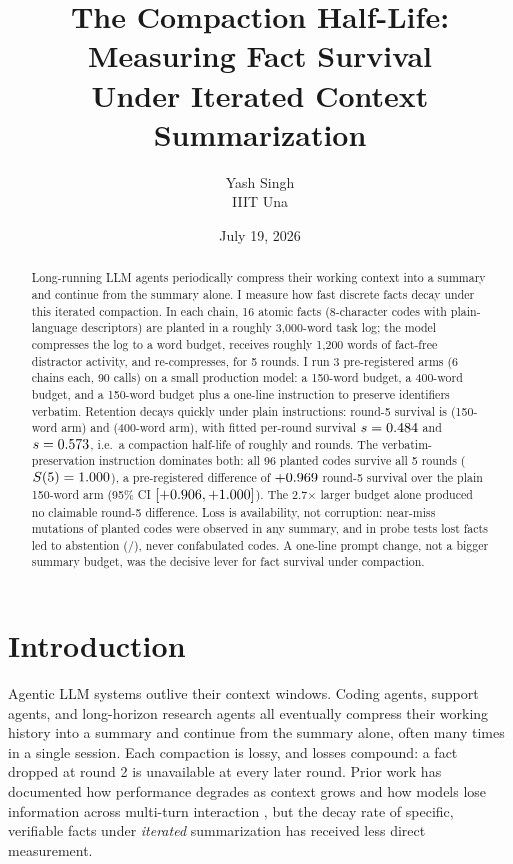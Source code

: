 \documentclass[11pt]{article}
\title{The Compaction Half-Life: Measuring Fact Survival\\Under Iterated Context Summarization}
\author{Yash Singh\\\small IIIT Una}
\date{July 19, 2026}
\begin{document}
\maketitle

\begin{abstract}
Long-running LLM agents periodically compress their working context into a
summary and continue from the summary alone. I measure how fast discrete facts
decay under this iterated compaction. In each chain, 16 atomic facts (8-character
codes with plain-language descriptors) are planted in a roughly 3{,}000-word task
log; the model compresses the log to a word budget, receives roughly 1{,}200 words
of fact-free distractor activity, and re-compresses, for 5 rounds. I run 3
pre-registered arms (6 chains each, 90 calls) on a small production model:
a 150-word budget, a 400-word budget, and a 150-word budget plus a one-line
instruction to preserve identifiers verbatim. Retention decays quickly under
plain instructions: round-5 survival is \ArmASrFive{} (150-word arm) and
\ArmBSrFive{} (400-word arm), with fitted per-round survival $s=0.484$ and
$s=0.573$, i.e.\ a compaction half-life of roughly \ArmAHalfLife{} and
\ArmBHalfLife{} rounds. The verbatim-preservation instruction dominates both:
all 96 planted codes survive all 5 rounds ($S(5)=1.000$), a pre-registered
difference of $+0.969$ round-5 survival over the plain 150-word arm
(95\% CI $[+0.906,+1.000]$). The 2.7$\times$ larger budget alone
produced no claimable round-5 difference. Loss is availability, not corruption:
\NMutated{} near-miss mutations of planted codes were observed in any summary,
and in probe tests lost facts led to abstention (\NProbeAbstained/\NProbeLost),
never confabulated codes. A one-line prompt change, not a bigger summary budget,
was the decisive lever for fact survival under compaction.
\end{abstract}

\section{Introduction}

Agentic LLM systems outlive their context windows. Coding agents, support
agents, and long-horizon research agents all eventually compress their working
history into a summary and continue from the summary alone, often many times in
a single session. Each compaction is lossy, and losses compound: a fact dropped
at round 2 is unavailable at every later round. Prior work has documented how
performance degrades as context grows \cite{hong2025contextrot} and how models
lose information across multi-turn interaction \cite{laban2025lost}, but the
decay rate of specific, verifiable facts under \emph{iterated} summarization
has received less direct measurement.
\end{document}
